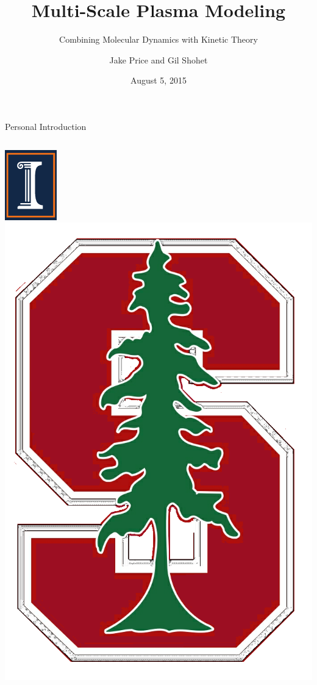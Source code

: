 \documentclass{beamer}
\begin{document}
	\title{Multi-Scale Plasma Modeling}
	\subtitle{Combining Molecular Dynamics with Kinetic Theory}
	\author[Price and Shohet]{Jake Price and Gil Shohet}
	\date{August 5, 2015}
	
	\begin{frame}
		\maketitle
	\end{frame}
	
	\begin{frame}[t]{Personal Introduction}
		\vspace{2em}
		\begin{columns}
			\column[t]{0.5\linewidth}
			\centering\includegraphics[height=0.25\textheight]{illinois.png}
			\column[t]{0.5\linewidth}
			\centering\includegraphics[height=0.25\textheight]{stanford.png}

\end{columns}
\end{frame}
\end{document}
